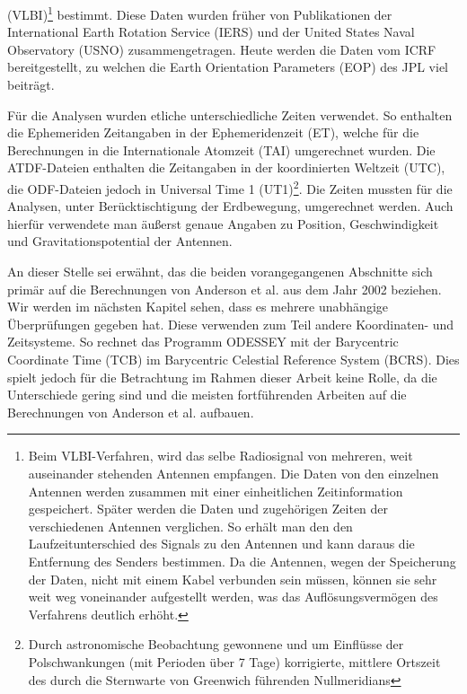 (VLBI)\footnote{Beim VLBI-Verfahren\cite{vlbi}, wird das selbe Radiosignal
von mehreren, weit auseinander stehenden Antennen empfangen. Die Daten
von den einzelnen Antennen werden zusammen mit einer einheitlichen
Zeitinformation gespeichert. Sp\"ater werden die Daten und
zugeh\"origen Zeiten der verschiedenen Antennen verglichen. So erh\"alt
man den den Laufzeitunterschied des Signals zu den Antennen und kann
daraus die Entfernung des Senders bestimmen. Da die Antennen, wegen der
Speicherung der Daten, nicht mit einem Kabel verbunden sein m\"ussen,
k\"onnen sie sehr weit weg voneinander aufgestellt werden, was das
Aufl\"osungsverm\"ogen des Verfahrens deutlich erh\"oht.} bestimmt.
Diese Daten wurden früher von Publikationen der International Earth Rotation Service (IERS) und der United States Naval Observatory (USNO) zusammengetragen. Heute werden die Daten vom ICRF bereitgestellt,
zu welchen die Earth Orientation Parameters (EOP) des JPL viel beiträgt\cite{Anderson2002}.

Für die Analysen wurden etliche unterschiedliche Zeiten verwendet. So enthalten die Ephemeriden Zeitangaben in der Ephemeridenzeit (ET),
welche für die Berechnungen in die Internationale Atomzeit (TAI) umgerechnet wurden. Die ATDF-Dateien enthalten die Zeitangaben in der koordinierten Weltzeit (UTC),
die ODF-Dateien jedoch in Universal Time 1 (UT1)\footnote{Durch astronomische Beobachtung gewonnene und um Einflüsse der Polschwankungen (mit Perioden über 7 Tage) korrigierte, mittlere Ortszeit des durch die Sternwarte von Greenwich führenden Nullmeridians}. Die Zeiten mussten für die Analysen, unter Berücktischtigung der Erdbewegung, umgerechnet werden.
Auch hierfür verwendete man äußerst genaue Angaben zu Position, Geschwindigkeit und Gravitationspotential der Antennen.\cite{Dittus2006}\cite{Anderson2002}\cite{Markwardt2002}

An dieser Stelle sei erwähnt, das die beiden vorangegangenen Abschnitte sich primär auf die Berechnungen von Anderson et al. aus dem Jahr 2002 beziehen.
Wir werden im nächsten Kapitel sehen, dass es mehrere unabhängige Überprüfungen gegeben hat.
Diese verwenden zum Teil andere Koordinaten- und Zeitsysteme.
So rechnet das Programm ODESSEY mit der Barycentric Coordinate Time (TCB) im Barycentric Celestial Reference System (BCRS).
Dies spielt jedoch für die Betrachtung im Rahmen dieser Arbeit keine Rolle, da die Unterschiede gering sind und die meisten fortführenden Arbeiten auf die Berechnungen von Anderson et al. aufbauen.	%

